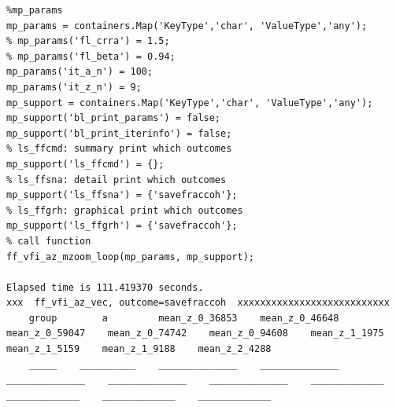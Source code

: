 \documentclass[
]{book}
\begin{document}
\begin{verbatim}
%mp_params
mp_params = containers.Map('KeyType','char', 'ValueType','any');
% mp_params('fl_crra') = 1.5;
% mp_params('fl_beta') = 0.94;
mp_params('it_a_n') = 100;
mp_params('it_z_n') = 9;
mp_support = containers.Map('KeyType','char', 'ValueType','any');
mp_support('bl_print_params') = false;
mp_support('bl_print_iterinfo') = false;
% ls_ffcmd: summary print which outcomes
mp_support('ls_ffcmd') = {};
% ls_ffsna: detail print which outcomes
mp_support('ls_ffsna') = {'savefraccoh'};
% ls_ffgrh: graphical print which outcomes
mp_support('ls_ffgrh') = {'savefraccoh'};
% call function
ff_vfi_az_mzoom_loop(mp_params, mp_support);

Elapsed time is 111.419370 seconds.
xxx  ff_vfi_az_vec, outcome=savefraccoh  xxxxxxxxxxxxxxxxxxxxxxxxxxx
    group        a         mean_z_0_36853    mean_z_0_46648    mean_z_0_59047    mean_z_0_74742    mean_z_0_94608    mean_z_1_1975    mean_z_1_5159    mean_z_1_9188    mean_z_2_4288
    _____    __________    ______________    ______________    ______________    ______________    ______________    _____________    _____________    _____________    _____________


\end{verbatim}
\end{document}
